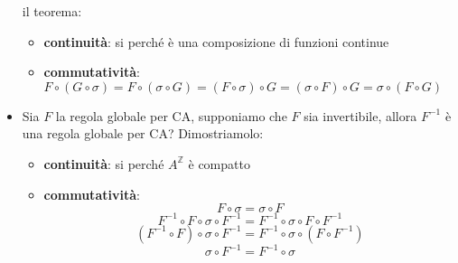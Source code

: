 \begin{itemize}
    il teorema:
    \begin{itemize}
        \item \textbf{continuità}: si perché è una composizione di funzioni continue
        \item \textbf{commutatività}: $F\circ (G\circ \sigma) = F\circ (\sigma\circ G) = (F\circ \sigma)\circ G =(\sigma\circ F)\circ G = \sigma\circ (F\circ G)$
    \end{itemize}
    \item Sia $F$ la regola globale per CA, supponiamo che $F$ sia invertibile, 
    allora $F^{-1}$ è una regola globale per CA? Dimostriamolo:
    \begin{itemize}
        \item \textbf{continuità}: si perché $A^\mathbb{Z}$ è compatto
        \item \textbf{commutatività}: $$F\circ \sigma = \sigma \circ F $$
        $$ F^{-1} \circ F\circ \sigma \circ F^{-1}= F^{-1}\circ \sigma \circ F \circ F^{-1}$$ 
        $$ (F^{-1} \circ F)\circ \sigma \circ F^{-1}= F^{-1}\circ \sigma \circ (F \circ F^{-1})$$
        $$ \sigma \circ F^{-1}= F^{-1}\circ \sigma$$
    \end{itemize}
\end{itemize}